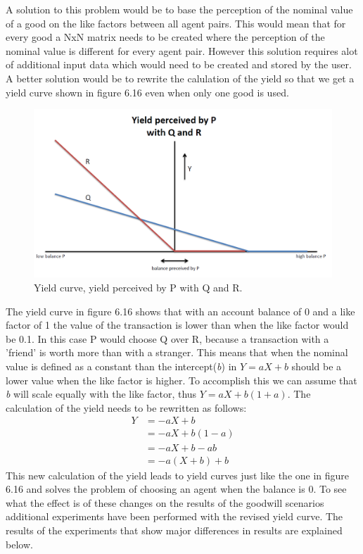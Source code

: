 \documentclass[twoside,openright]{uva-bachelor-thesis}
\begin{document}
A solution to this problem would be to base the perception of the nominal value of a good on the like factors between all agent pairs. This would mean that for every good a NxN matrix needs to be created where the perception of the nominal value is different for every agent pair. However this solution requires alot of additional input data which would need to be created and stored by the user. A better solution would be to rewrite the calulation of the yield so that we get a yield curve shown in figure 6.16 even when only one good is used. \\
\begin{figure}[h!]
 
  \centering
    \includegraphics[scale=0.4]{YieldCurves/yieldcurve_P_QR2}
 \caption{Yield curve, yield perceived by P with Q and R.}
\end{figure}

The yield curve in figure 6.16 shows that with an account balance of 0 and a like factor of 1 the value of the transaction is lower than when the like factor would be 0.1. In this case P would choose Q over R, because a transaction with a 'friend' is worth more than with a stranger. This means that when the nominal value is defined as a constant than the intercept(\textit{b}) in \textit{$Y = aX + b$} should be a lower value when the like factor is higher. To accomplish this we can assume that \textit{b} will scale equally with the like factor, thus \textit{$Y = aX + b(1 + a)$}.  The calculation of the yield needs to be rewritten as follows:
\begin{equation}
\begin{split}
  Y & = -aX + b \\
     & = -aX + b(1 - a) \\
     & = -aX + b - ab \\
     & = -a(X + b) + b 
\end{split}
\end{equation}
This new calculation of the yield leads to yield curves just like the one in figure 6.16 and solves the problem of choosing an agent when the balance is 0. To see what the effect is of these changes on the results of the goodwill scenarios additional experiments have been performed with the revised yield curve. The results of the experiments that show major differences in results are explained below.
\end{document}
